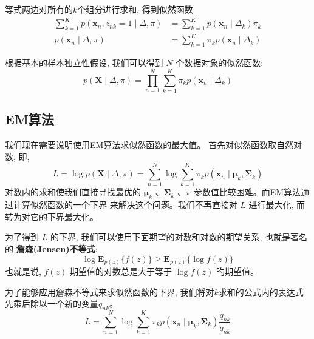\documentclass[UTF8]{ctexart}
\begin{document}
等式两边对所有的$k$个组分进行求和, 得到似然函数
$$
\begin{aligned}
\sum_{k=1}^{K} p\left(\boldsymbol{x}_{n}, z_{n k}=1 \mid \Delta, \pi\right)&=\sum_{k=1}^{K} p\left(\boldsymbol{x}_{n} \mid \Delta_{k}\right) \pi_{k} \\
p\left(\boldsymbol{x}_{n} \mid \Delta, \pi\right)&=\sum_{k=1}^{K} \pi_{k} p\left(\boldsymbol{x}_{n} \mid \Delta_{k}\right) 
\end{aligned}
$$

根据基本的样本独立性假设, 我们可以得到 $N$ 个数据对象的似然函数:
\begin{equation}
p(\boldsymbol{X} \mid \Delta, \pi)=\prod_{n=1}^{N} \sum_{k=1}^{K} \pi_{k} p\left(\boldsymbol{x}_{n} \mid \Delta_{k}\right)  
\end{equation}

\subsection{EM算法}
我们现在需要说明使用EM算法求似然函数的最大值。
首先对似然函数取自然对数, 即,
\begin{equation}
L=\log p(\boldsymbol{X} \mid \Delta, \pi)=\sum_{n=1}^{N} \log \sum_{k=1}^{K} \pi_{k} p\left(\boldsymbol{x}_{n} \mid \boldsymbol{\mu}_{k}, \boldsymbol{\Sigma}_{k}\right) 
\end{equation}
对数内的求和使我们直接寻找最优的 
$\boldsymbol{\mu}_{k}$ 、$\boldsymbol{\Sigma}_{k}$
、$\pi$ 参数值比较困难。而EM算法通过计算似然函数的一个下界
来解决这个问题。我们不再直接对 $L$ 进行最大化, 而转为对它的下界最大化。

为了得到 $L$ 的下界, 我们可以使用下面期望的对数和对数的期望关系, 也就是著名的 
\textbf{詹森(Jensen)不等式}:
\begin{equation}
    \log \boldsymbol{E}_{p(z)}\{f(z)\} \geqslant \boldsymbol{E}_{p(z)}\{\log f(z)\}
\end{equation}
也就是说, $f(z)$ 期望值的对数总是大于等于 $\log f(z)$ 旳期望值。

为了能够应用詹森不等式来求似然函数的下界, 
我们将对$k$求和的公式内的表达式先乘后除以一个新的变量$q_{n k}$。
\begin{equation}
L=\sum_{n=1}^{N} \log \sum_{k=1}^{K} \pi_{k} p\left(\boldsymbol{x}_{n} \mid \boldsymbol{\mu}_{k}, \boldsymbol{\Sigma}_{k}\right) \frac{q_{n k}}{q_{n k}}   
\end{equation}
\end{document}
